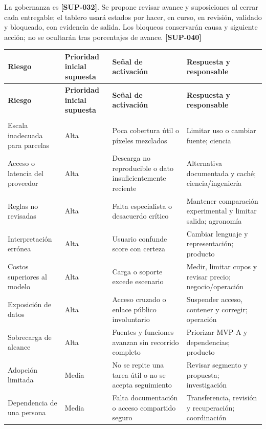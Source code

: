 \documentclass[10pt,a4paper]{article}
\begin{document}
La gobernanza es \textbf{[SUP-032]}. Se propone revisar avance y suposiciones al cerrar cada entregable; el tablero usará estados por hacer, en curso, en revisión, validado y bloqueado, con evidencia de salida. Los bloqueos conservarán causa y siguiente acción; no se ocultarán tras porcentajes de avance. \textbf{[SUP-040]}


\begingroup\small
\begin{longtable}{>{\raggedright\arraybackslash}p{3.115cm}>{\raggedright\arraybackslash}p{3.582cm}>{\raggedright\arraybackslash}p{4.517cm}>{\raggedright\arraybackslash}p{4.361cm}}
\toprule
\textbf{Riesgo} & \textbf{Prioridad inicial supuesta} & \textbf{Señal de activación} & \textbf{Respuesta y responsable} \\
\midrule\endfirsthead
\toprule
\textbf{Riesgo} & \textbf{Prioridad inicial supuesta} & \textbf{Señal de activación} & \textbf{Respuesta y responsable} \\
\midrule\endhead
\midrule\multicolumn{4}{r}{\scriptsize Continúa en la página siguiente}\\\endfoot
\bottomrule\endlastfoot
Escala inadecuada para parcelas & Alta & Poca cobertura útil o píxeles mezclados & Limitar uso o cambiar fuente; ciencia \\[3pt]
Acceso o latencia del proveedor & Alta & Descarga no reproducible o dato insuficientemente reciente & Alternativa documentada y caché; ciencia/\allowbreak{}ingeniería \\[3pt]
Reglas no revisadas & Alta & Falta especialista o desacuerdo crítico & Mantener comparación experimental y limitar salida; agronomía \\[3pt]
Interpretación errónea & Alta & Usuario confunde score con certeza & Cambiar lenguaje y representación; producto \\[3pt]
Costos superiores al modelo & Alta & Carga o soporte excede escenario & Medir, limitar cupos y revisar precio; negocio/\allowbreak{}operación \\[3pt]
Exposición de datos & Alta & Acceso cruzado o enlace público involuntario & Suspender acceso, contener y corregir; operación \\[3pt]
Sobrecarga de alcance & Alta & Fuentes y funciones avanzan sin recorrido completo & Priorizar MVP-A y dependencias; producto \\[3pt]
Adopción limitada & Media & No se repite una tarea útil o no se acepta seguimiento & Revisar segmento y propuesta; investigación \\[3pt]
Dependencia de una persona & Media & Falta documentación o acceso compartido seguro & Transferencia, revisión y recuperación; coordinación \\[3pt]
\end{longtable}
\endgroup
\end{document}
